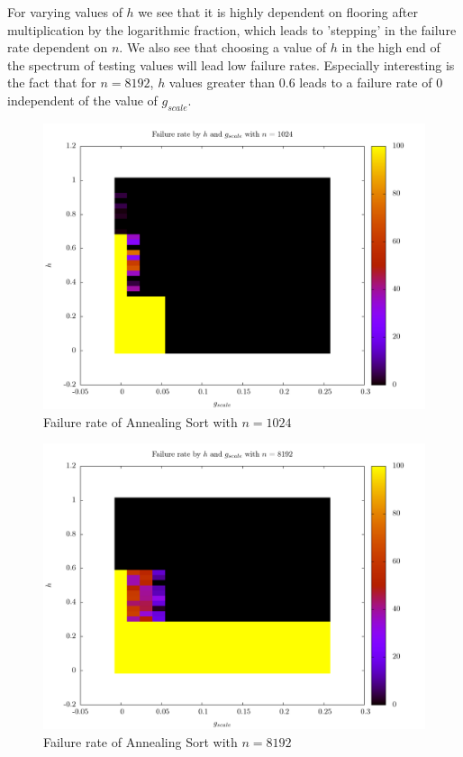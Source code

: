 For varying values of $h$ we see that it is highly dependent on flooring after multiplication by the logarithmic fraction, which leads to 'stepping' in the failure rate dependent on $n$. We also see that choosing a value of $h$ in the high end of the spectrum of testing values will lead low failure rates. Especially interesting is the fact that for $n = 8192$, $h$ values greater than $0.6$ leads to a failure rate of 0 independent of the value of $g_{scale}$.

\begin{figure}
\center
\includegraphics[width=\textwidth]{graphs/Annealing/annealing1024percent.pdf}
\caption{Failure rate of Annealing Sort with $n = 1024$}
\label{fig:Annealing:percent1024}
\end{figure}

\begin{figure}
\center
\includegraphics[width=\textwidth]{graphs/Annealing/annealing8192percent.pdf}
\caption{Failure rate of Annealing Sort with  $n = 8192$}
\label{fig:Annealing:percent8192}
\end{figure}

